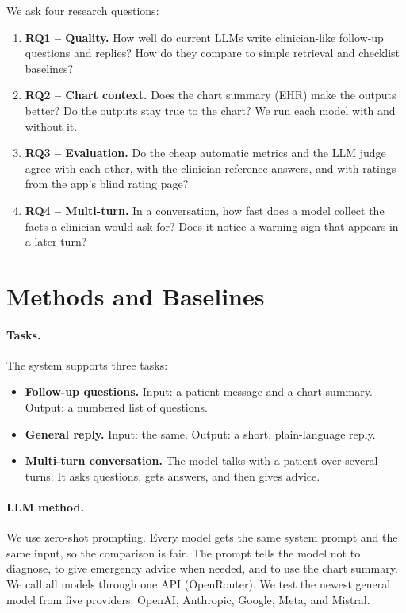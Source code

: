 \documentclass[11pt]{article}
\begin{document}
\noindent We ask four research questions:
\begin{enumerate}
  \item \textbf{RQ1 -- Quality.} How well do current LLMs write clinician-like follow-up questions and replies? How do they compare to simple retrieval and checklist baselines?
  \item \textbf{RQ2 -- Chart context.} Does the chart summary (EHR) make the outputs better? Do the outputs stay true to the chart? We run each model with and without it.
  \item \textbf{RQ3 -- Evaluation.} Do the cheap automatic metrics and the LLM judge agree with each other, with the clinician reference answers, and with ratings from the app's blind rating page?
  \item \textbf{RQ4 -- Multi-turn.} In a conversation, how fast does a model collect the facts a clinician would ask for? Does it notice a warning sign that appears in a later turn?
\end{enumerate}

\section{Methods and Baselines}

\paragraph{Tasks.} The system supports three tasks:
\begin{itemize}
  \item \textbf{Follow-up questions.} Input: a patient message and a chart summary. Output: a numbered list of questions.
  \item \textbf{General reply.} Input: the same. Output: a short, plain-language reply.
  \item \textbf{Multi-turn conversation.} The model talks with a patient over several turns. It asks questions, gets answers, and then gives advice.
\end{itemize}

\paragraph{LLM method.}
We use zero-shot prompting.
Every model gets the same system prompt and the same input, so the comparison is fair.
The prompt tells the model not to diagnose, to give emergency advice when needed, and to use the chart summary.
We call all models through one API (OpenRouter).
We test the newest general model from five providers: OpenAI, Anthropic, Google, Meta, and Mistral.
\end{document}
